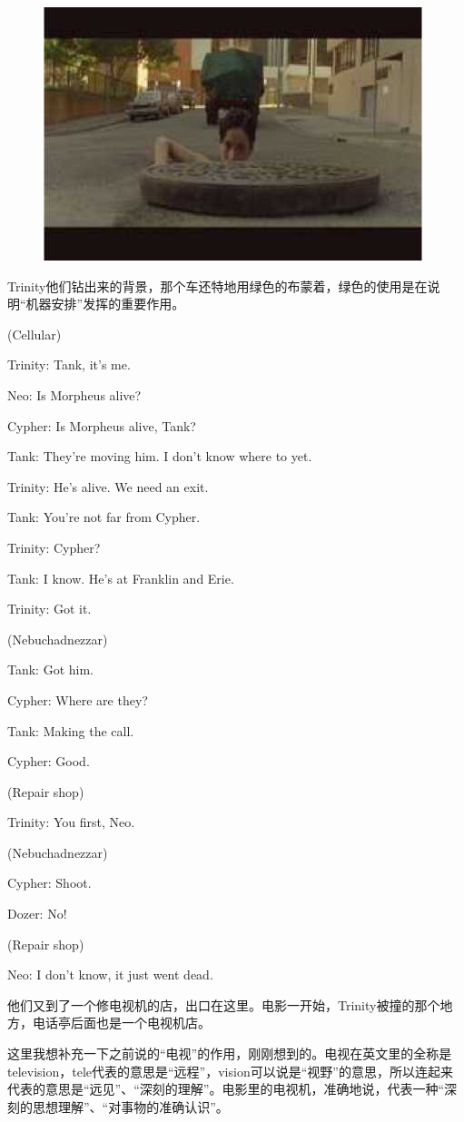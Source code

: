 \documentclass[UTF8]{ctexart}
\newenvironment{myquote}{\color{green} \setlength{\leftskip}{6em} \setlength{\rightskip}{4em} \setlength{\parindent}{-2em}}{\par}
\begin{document}
\begin{figure}[htb]
\centering
\includegraphics[width=0.5\linewidth]{fig/read_Matrix-58}
\end{figure}

Trinity他们钻出来的背景，那个车还特地用绿色的布蒙着，绿色的使用是在说明“机器安排”发挥的重要作用。

\begin{myquote}
(Cellular)

Trinity: Tank, it's me.

Neo: Is Morpheus alive?

Cypher: Is Morpheus alive, Tank?

Tank: They're moving him. I don't know where to yet.

Trinity: He's alive. We need an exit.

Tank: You're not far from Cypher.

Trinity: Cypher?

Tank: I know. He's at Franklin and Erie.

Trinity: Got it.

(Nebuchadnezzar)

Tank: Got him.

Cypher: Where are they?

Tank: Making the call.

Cypher: Good.

(Repair shop)

Trinity: You first, Neo.

(Nebuchadnezzar)

Cypher: Shoot.

Dozer: No!

(Repair shop)

Neo: I don't know, it just went dead.
\end{myquote}

他们又到了一个修电视机的店，出口在这里。电影一开始，Trinity被撞的那个地方，电话亭后面也是一个电视机店。

这里我想补充一下之前说的“电视”的作用，刚刚想到的。电视在英文里的全称是television，tele代表的意思是“远程”，vision可以说是“视野”的意思，所以连起来代表的意思是“远见”、“深刻的理解”。电影里的电视机，准确地说，代表一种“深刻的思想理解”、“对事物的准确认识”。
\end{document}
